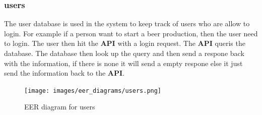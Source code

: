 \subsubsection{users}%
\label{ssub:users}



The user database is used in the system to keep track of users who are allow to
login. For example if a person want to start a beer production, then the user 
need to login. The user then hit the \textbf{API} with a login request. 
The \textbf{API} queris the database. The database then look up the query and 
then send a respone back with the information, if there is none it will send a
empty respone else it just send the information back to the \textbf{API}.
\begin{figure}[ht]
\centering 
\texttt{[image: images/eer\_diagrams/users.png]}
\caption{EER diagram for users} 
\label{figure:eer_diagram_users}
\end{figure}
